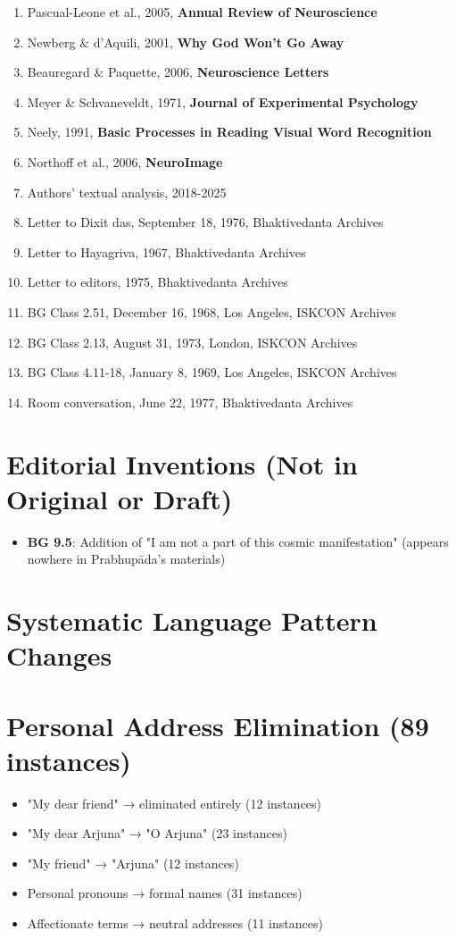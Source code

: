 \documentclass[11pt,twoside]{book}
\begin{document}
\begin{enumerate}
\item Pascual-Leone et al., 2005, \textbf{Annual Review of Neuroscience}
\item Newberg \& d'Aquili, 2001, \textbf{Why God Won't Go Away}
\item Beauregard \& Paquette, 2006, \textbf{Neuroscience Letters}
\item Meyer \& Schvaneveldt, 1971, \textbf{Journal of Experimental Psychology}
\item Neely, 1991, \textbf{Basic Processes in Reading Visual Word Recognition}
\item Northoff et al., 2006, \textbf{NeuroImage}
\item Authors' textual analysis, 2018-2025
\item Letter to Dixit das, September 18, 1976, Bhaktivedanta Archives
\item Letter to Hayagriva, 1967, Bhaktivedanta Archives
\item Letter to editors, 1975, Bhaktivedanta Archives
\item BG Class 2.51, December 16, 1968, Los Angeles, ISKCON Archives
\item BG Class 2.13, August 31, 1973, London, ISKCON Archives
\item BG Class 4.11-18, January 8, 1969, Los Angeles, ISKCON Archives
\item Room conversation, June 22, 1977, Bhaktivedanta Archives
\end{enumerate}
\section*{Editorial Inventions (Not in Original or Draft)}
\label{sec:org646dc52}
\begin{itemize}
\item \textbf{\textbf{BG 9.5}}: Addition of "I am not a part of this cosmic manifestation" (appears nowhere in Prabhupāda's materials)
\end{itemize}
\section*{Systematic Language Pattern Changes}
\label{sec:org8a90ec5}

\section*{Personal Address Elimination (89 instances)}
\label{sec:org454fe91}
\begin{itemize}
\item "My dear friend" → eliminated entirely (12 instances)
\item "My dear Arjuna" → "O Arjuna" (23 instances)
\item "My friend" → "Arjuna" (12 instances)
\item Personal pronouns → formal names (31 instances)
\item Affectionate terms → neutral addresses (11 instances)
\end{itemize}
\end{document}
